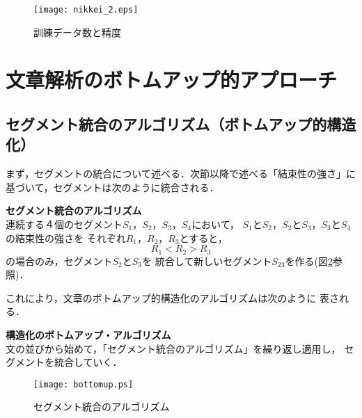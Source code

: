 \begin{figure}
\begin{center}
\texttt{[image: nikkei\_2.eps]}
\caption{訓練データ数と精度}\label{kunren}
\end{center}
\end{figure}

\section{文章解析のボトムアップ的アプローチ}

\subsection{セグメント統合のアルゴリズム（ボトムアップ的構造化）}

まず，セグメントの統合について述べる．次節以降で述べる「結束性の強さ」に
基づいて，セグメントは次のように統合される．
\begin{description}
 \item {\bf セグメント統合のアルゴリズム}\\
連続する４個のセグメント\hspace{-0.2mm}$S_1$，$S_2$，$S_3$，$S_4$において，
$S_1$と$S_2$，$S_2$と$S_3$，$S_3$と$S_4$\hspace{-0.2mm}の結束性の強さを
それぞれ\hspace{-0.2mm}$R_1$，$R_2$，$R_3$\hspace{-0.2mm}とすると，
       \[
	R_1 < R_2 > R_3
       \]
の場合のみ，セグメント$S_2$と$S_3$を
統合して新しいセグメント$S_{23}$を作る(図\ref{bottomup}参照)．
\end{description}

これにより，文章のボトムアップ的構造化のアルゴリズムは次のように
表される．
\begin{description}
\item{\bf 構造化のボトムアップ・アルゴリズム}\\
文の並びから始めて，「セグメント統合のアルゴリズム」を繰り返し適用し，
セグメントを統合していく．
\end{description}

\begin{figure}[htbp]
\begin{center}
\texttt{[image: bottomup.ps]}
\caption{セグメント統合のアルゴリズム}\label{bottomup}
\end{center}
\end{figure}

